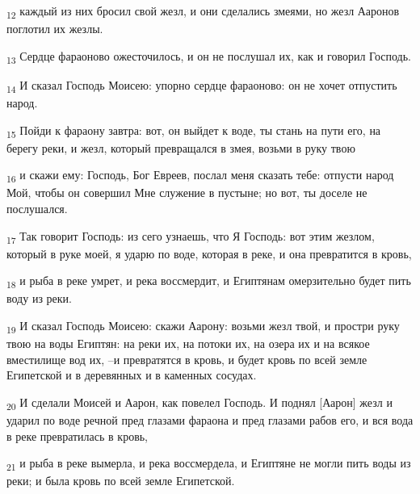 \begin{tcolorbox}
\textsubscript{12} каждый из них бросил свой жезл, и они сделались змеями, но жезл Ааронов поглотил их жезлы.
\end{tcolorbox}
\begin{tcolorbox}
\textsubscript{13} Сердце фараоново ожесточилось, и он не послушал их, как и говорил Господь.
\end{tcolorbox}
\begin{tcolorbox}
\textsubscript{14} И сказал Господь Моисею: упорно сердце фараоново: он не хочет отпустить народ.
\end{tcolorbox}
\begin{tcolorbox}
\textsubscript{15} Пойди к фараону завтра: вот, он выйдет к воде, ты стань на пути его, на берегу реки, и жезл, который превращался в змея, возьми в руку твою
\end{tcolorbox}
\begin{tcolorbox}
\textsubscript{16} и скажи ему: Господь, Бог Евреев, послал меня сказать тебе: отпусти народ Мой, чтобы он совершил Мне служение в пустыне; но вот, ты доселе не послушался.
\end{tcolorbox}
\begin{tcolorbox}
\textsubscript{17} Так говорит Господь: из сего узнаешь, что Я Господь: вот этим жезлом, который в руке моей, я ударю по воде, которая в реке, и она превратится в кровь,
\end{tcolorbox}
\begin{tcolorbox}
\textsubscript{18} и рыба в реке умрет, и река воссмердит, и Египтянам омерзительно будет пить воду из реки.
\end{tcolorbox}
\begin{tcolorbox}
\textsubscript{19} И сказал Господь Моисею: скажи Аарону: возьми жезл твой, и простри руку твою на воды Египтян: на реки их, на потоки их, на озера их и на всякое вместилище вод их, --и превратятся в кровь, и будет кровь по всей земле Египетской и в деревянных и в каменных сосудах.
\end{tcolorbox}
\begin{tcolorbox}
\textsubscript{20} И сделали Моисей и Аарон, как повелел Господь. И поднял [Аарон] жезл и ударил по воде речной пред глазами фараона и пред глазами рабов его, и вся вода в реке превратилась в кровь,
\end{tcolorbox}
\begin{tcolorbox}
\textsubscript{21} и рыба в реке вымерла, и река воссмердела, и Египтяне не могли пить воды из реки; и была кровь по всей земле Египетской.
\end{tcolorbox}
